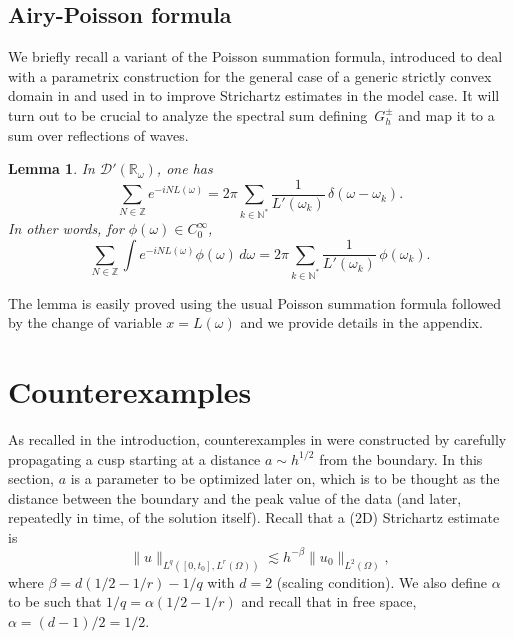 \documentclass[JEP,XML,SOM,Unicode,NoEqCountersInSection,NoFloatCountersInSection,published]{cedram}
\let\mathcal\mathscr
\newcommand\N{{\mathbb N}}
\newcommand\R{{\mathbb R}}
\newcommand\Z{{\mathbb Z}}
\theoremstyle{plain}
\newtheorem{lemma}{Lemma}
\theoremstyle{definition}
\begin{document}
\subsection{Airy-Poisson formula}
We briefly recall a variant of the Poisson summation formula, introduced to deal with a parametrix construction for the general case of a generic strictly convex domain in \cite{ILLP} and used in \cite{ILP3} to improve Strichartz estimates in the model case. It will turn out to be crucial to analyze the spectral sum defining~$G^{\pm}_{h}$ and map it to a sum over reflections of waves.
\begin{lemma}
\label{AiryPoisson}
In $\mathcal{D}'(\R_\omega)$, one has
\begin{equation*}
\label{eq:AiryPoisson}
\sum_{N\in \Z} e^{-i NL(\omega)}= 2\pi \sum_{k\in \N^*} \frac 1
{L'(\omega_k)}\, \delta(\omega-\omega_k).
\end{equation*}
In other words, for $\phi(\omega)\in C_{0}^{\infty}$,
\begin{equation}
\label{eq:AiryPoissonBis}
\sum_{N\in \Z} \int e^{-i NL(\omega)} \phi(\omega)\,d\omega = 2\pi \sum_{k\in \N^*} \frac 1
{L'(\omega_k)}\, \phi(\omega_k).
\end{equation}

\end{lemma}
The lemma is easily proved using the usual Poisson summation formula
followed by the change of variable $x=L(\omega)$ and we provide details in the appendix.

\section{Counterexamples}
As recalled in the introduction, counterexamples in \cite{doi} were constructed by carefully
propagating a cusp starting at a distance $a\sim h^{1/2}$ from the boundary. In this section, $a$ is a parameter to be optimized later on, which is to be thought as the distance between the boundary and the peak value of the data (and later, repeatedly in time, of the solution itself). Recall that a (2D) Strichartz estimate is
\begin{equation}
\label{eq:31}
\| u\|_{L^{q}([0,t_{0}],L^{r}(\Omega))}\lesssim h^{-\beta} \|u_{0}\|_{L^{2}(\Omega)},
\end{equation}
where $\beta=d(1/2-1/r)-1/q$ with $d=2$ (scaling condition). We also define $\alpha$ to be such that $1/q=\alpha(1/2-1/r)$ and recall that in free space, $\alpha=(d-1)/2=1/2$.
\end{document}
